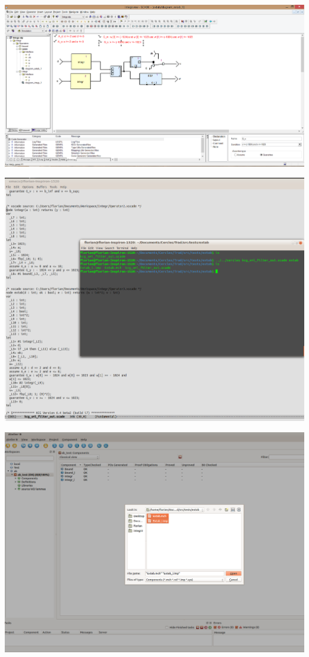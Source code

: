 \documentclass[10pt]{beamer}
\begin{document}
\begin{frame}
\includegraphics[scale=0.30]{1_scade.png}
\end{frame}
\begin{frame}
\includegraphics[scale=0.23]{2_term.png}
\end{frame}
\begin{frame}
\includegraphics[scale=0.23]{3_open.png}
\end{frame}
\end{document}
